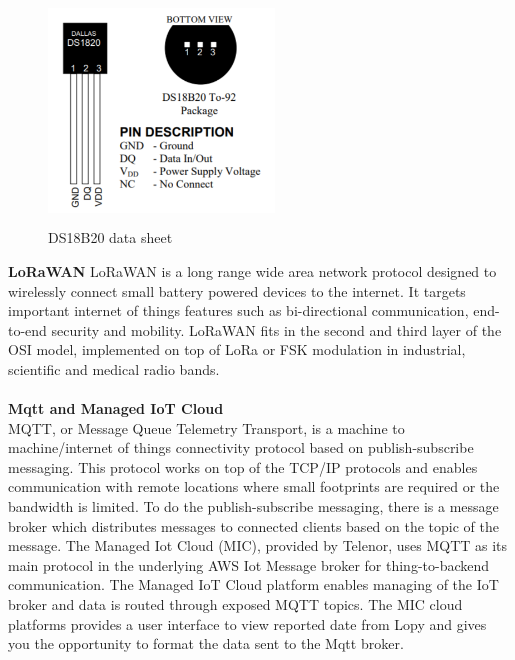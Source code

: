 		\begin{figure}[h]
			\caption{DS18B20 data sheet}
			\includegraphics[width=6cm, height=6cm]{tempsensordatasheet}
		\end{figure}
\textbf{LoRaWAN}
		LoRaWAN is a long range wide area network protocol designed to wirelessly connect small battery powered devices to the internet. It targets important internet of things features such as bi-directional communication, end-to-end security and mobility. LoRaWAN fits in the second and third layer of the OSI model, implemented on top of LoRa or FSK modulation in industrial, scientific and medical radio bands\cite{LoRaWAN}.
		\\\\
		\textbf{Mqtt and Managed IoT Cloud} \\
		MQTT, or Message Queue Telemetry Transport, is a machine to machine/internet of things connectivity protocol based on publish-subscribe messaging. This protocol works on top of the TCP/IP protocols and enables communication with remote locations where small footprints are required or the bandwidth is limited. To do the publish-subscribe messaging, there is a message broker which distributes messages to connected clients based on the topic of the message\cite{wikiMQTT}. The Managed Iot Cloud (MIC), provided by Telenor, uses MQTT as its main protocol in the underlying AWS Iot Message broker for thing-to-backend communication. The Managed IoT Cloud platform enables managing of the IoT broker and data is routed through exposed MQTT topics. The MIC cloud platforms provides a user interface to view reported date from Lopy and gives you the opportunity to format the data sent to the Mqtt broker\cite{telenorIOT}.
		
		
		
